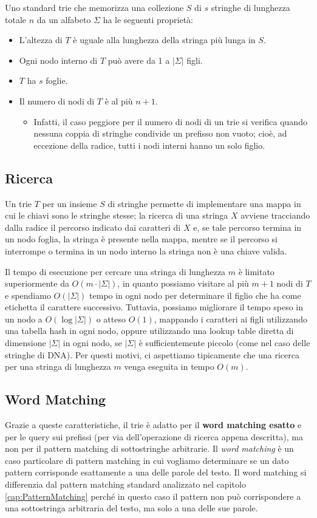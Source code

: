 \clearpage
\noindent
Uno standard trie che memorizza una collezione $S$ di $s$ stringhe di lunghezza totale $n$ da un alfabeto $\Sigma$ ha le seguenti proprietà:
\begin{itemize}[nosep]
    \item L'altezza di $T$ è uguale alla lunghezza della stringa più lunga in $S$.
    \item Ogni nodo interno di $T$ può avere da 1 a $|\Sigma|$ figli.
    \item $T$ ha $s$ foglie.
    \item Il numero di nodi di $T$ è al più $n+1$. 
        \begin{itemize}
            \item Infatti, il caso peggiore per il numero di nodi di un trie si verifica quando nessuna coppia di stringhe condivide un prefisso non vuoto; cioè, ad eccezione della radice, tutti i nodi interni hanno un solo figlio.
        \end{itemize}
\end{itemize}

\subsection*{Ricerca}
Un trie $T$ per un insieme $S$ di stringhe permette di implementare una mappa in cui le chiavi sono le stringhe stesse; la ricerca di una stringa $X$ avviene tracciando dalla radice il percorso indicato dai caratteri di $X$ e, se tale percorso termina in un nodo foglia, la stringa è presente nella mappa, mentre se il percorso si interrompe o termina in un nodo interno la stringa non è una chiave valida. 

Il tempo di esecuzione per cercare una stringa di lunghezza $m$ è limitato superiormente da $O(m \cdot |\Sigma|)$, in quanto possiamo visitare al più $m+1$ nodi di $T$ e spendiamo $O(|\Sigma|)$ tempo in ogni nodo per determinare il figlio che ha come etichetta il carattere successivo. Tuttavia, possiamo migliorare il tempo speso in un nodo a $O(\log |\Sigma|)$ o atteso $O(1)$, mappando i caratteri ai figli utilizzando una tabella hash in ogni nodo, oppure utilizzando una lookup table diretta di dimensione $|\Sigma|$ in ogni nodo, se $|\Sigma|$ è sufficientemente piccolo (come nel caso delle stringhe di DNA). Per questi motivi, ci aspettiamo tipicamente che una ricerca per una stringa di lunghezza $m$ venga eseguita in tempo $O(m)$.

\subsection*{Word Matching}
Grazie a queste caratteristiche, il trie è adatto per il \textbf{word matching esatto} e per le query sui prefissi (per via dell'operazione di ricerca appena descritta), ma non per il pattern matching di sottostringhe arbitrarie. Il \emph{word matching} è un caso particolare di pattern matching in cui vogliamo determinare se un dato pattern corrisponde esattamente a una delle parole del testo. Il word matching si differenzia dal pattern matching standard analizzato nel capitolo \ref{cap:PatternMatching} perché in questo caso il pattern non può corrispondere a una sottostringa arbitraria del testo, ma solo a una delle sue parole.


